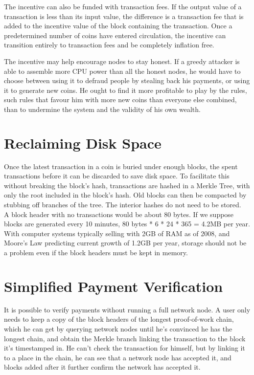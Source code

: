 \documentclass{article}
\begin{document}
The incentive can also be funded with transaction fees.
If the output value of a transaction is
less than its input value, the difference is a transaction fee that is added to the incentive value of
the block containing the transaction.
Once a predetermined number of coins have entered
circulation, the incentive can transition entirely to transaction fees and be completely inflation
free.

The incentive may help encourage nodes to stay honest.
If a greedy attacker is able to
assemble more CPU power than all the honest nodes, he would have to choose between using it
to defraud people by stealing back his payments, or using it to generate new coins.
He ought to find it more profitable to play by the rules, such rules that favour him with more new coins than
everyone else combined, than to undermine the system and the validity of his own wealth.

\section{Reclaiming Disk Space}\label{sec:reclaiming-disk-space}
Once the latest transaction in a coin is buried under enough blocks, the spent transactions before
it can be discarded to save disk space.
To facilitate this without breaking the block's hash,
transactions are hashed in a Merkle Tree\cite{merkle1980protocols}\cite{massias1999design}\cite{haber1997secure},
with only the root included in the block's hash.
Old blocks can then be compacted by stubbing off branches of the tree.
The interior hashes do not need to be stored.\\



A block header with no transactions would be about 80 bytes.
If we suppose blocks are generated every 10 minutes, 80 bytes * 6 * 24 * 365 = 4.2MB per year.
With computer systems typically selling with 2GB of RAM as of 2008, and Moore's Law predicting current growth of
1.2GB per year, storage should not be a problem even if the block headers must be kept in memory.

\section{Simplified Payment Verification}\label{sec:simplified-payment-verification}
It is possible to verify payments without running a full network node.
A user only needs to keep a copy of the block headers of the longest proof-of-work chain,
which he can get by querying network nodes until he's convinced he has the longest chain,
and obtain the Merkle branch linking the transaction to the block it's timestamped in.
He can't check the transaction for himself,
but by linking it to a place in the chain,
he can see that a network node has accepted it,
and blocks added after it further confirm the network has accepted it. \\
\end{document}
